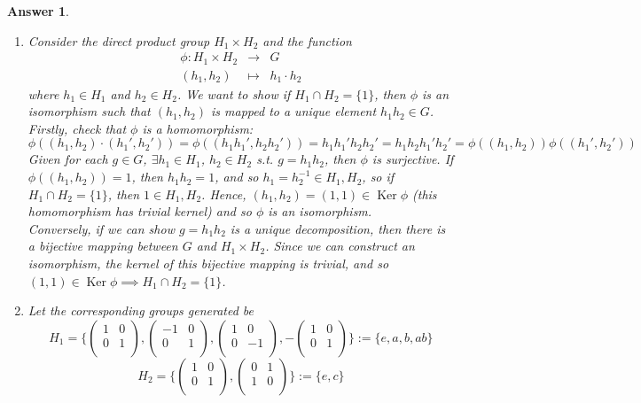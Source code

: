 \documentclass[a4paper]{article}
\DeclareMathOperator{\Ker}{Ker}
\newtheorem{ans}{Answer}[section]
\theoremstyle{new}
\begin{document}
\begin{ans}\leavevmode
\begin{enumerate}[label=(\alph*)]
\item Consider the direct product group $H_1\times H_2$ and the function
\begin{eqnarray}
\phi: H_1\times H_2&\rightarrow&G\nonumber\\(h_1,h_2)&\mapsto& h_1\cdot h_2\nonumber
\end{eqnarray}
where $h_1\in H_1$ and $h_2\in H_2$. We want to show if $H_1\cap H_2=\{1\}$, then $\phi$ is an isomorphism such that $(h_1,h_2)$ is mapped to a unique element $h_1h_2\in G$. Firstly, check that $\phi$ is a homomorphism:
$$\phi((h_1,h_2)\cdot(h_1',h_2'))=\phi((h_1h_1',h_2h_2'))=h_1h_1'h_2h_2'=h_1h_2h_1'h_2'=\phi((h_1,h_2))\phi((h_1',h_2'))$$
Given for each $g\in G$, $\exists h_1\in H_1$, $h_2\in H_2$ s.t. $g=h_1h_2$, then $\phi$ is surjective. If $\phi((h_1,h_2))=1$, then $h_1h_2=1$, and so $h_1=h_2^{-1}\in H_1,H_2$, so if $H_1\cap H_2=\{1\}$, then $1\in H_1,H_2$. Hence, $(h_1,h_2)=(1,1)\in\Ker\phi$ (this homomorphism has trivial kernel) and so $\phi$ is an isomorphism.\\[5pt]
Conversely, if we can show $g=h_1h_2$ is a unique decomposition, then there is a bijective mapping between $G$ and $H_1\times H_2$. Since we can construct an isomorphism, the kernel of this bijective mapping is trivial, and so $(1,1)\in\Ker\phi\implies H_1\cap H_2=\{1\}$.
\item Let the corresponding groups generated be
$$H_1=\bigg\{\begin{pmatrix}1&0\\0&1\\\end{pmatrix},\begin{pmatrix}-1&0\\0&1\\\end{pmatrix},\begin{pmatrix}1&0\\0&-1\\\end{pmatrix},-\begin{pmatrix}1&0\\0&1\\\end{pmatrix}\bigg\}:=\{e,a,b,ab\}$$
$$H_2=\bigg\{\begin{pmatrix}1&0\\0&1\\\end{pmatrix},\begin{pmatrix}0&1\\1&0\\\end{pmatrix}\bigg\}:=\{e,c\}$$

\end{enumerate}
\end{ans}
\end{document}
